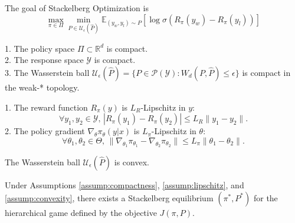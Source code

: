 The goal of Stackelberg Optimization is 
\begin{equation}
    \max_{\pi \in \Pi} \min_{P \in \mathcal{U}_\epsilon(\hat{P})} \mathbb{E}_{(y_w,y_l) \sim P} \left[\log \sigma(R_\pi(y_w) - R_\pi(y_l))\right]
\end{equation}

\begin{assumption}[Compactness]
\label{assump:compactness}
1. The policy space \( \Pi \subset \mathbb{R}^d \) is compact. \\
2. The response space \( \mathcal{Y} \) is compact. \\
3. The Wasserstein ball \( \mathcal{U}_\epsilon(\hat{P}) = \{ P \in \mathcal{P}(\mathcal{Y}) : W_d(P, \hat{P}) \leq \epsilon \} \) is compact in the weak-* topology.
\end{assumption}

\begin{assumption}
\label{assump:lipschitz}
1. The reward function \( R_\pi(y) \) is \( L_R \)-Lipschitz in \( y \): 
\[
\forall y_1, y_2 \in \mathcal{Y}, \, |R_\pi(y_1) - R_\pi(y_2)| \leq L_R \| y_1 - y_2 \|.
\]
2. The policy gradient \( \nabla_\theta \pi_\theta(y|x) \) is \( L_\pi \)-Lipschitz in \( \theta \):
\[
\forall \theta_1, \theta_2 \in \Theta, \, \| \nabla_{\theta_1} \pi_{\theta_1} - \nabla_{\theta_2} \pi_{\theta_2} \| \leq L_\pi \| \theta_1 - \theta_2 \|.
\]
\end{assumption}

\begin{assumption}[Convexity]
\label{assump:convexity}
The Wasserstein ball \( \mathcal{U}_\epsilon(\hat{P}) \) is convex.
\end{assumption}

\begin{proposition}
\label{prop:existence}
Under Assumptions \ref{assump:compactness}, \ref{assump:lipschitz}, and \ref{assump:convexity}, there exists a Stackelberg equilibrium \( (\pi^*, P^*) \) for the hierarchical game defined by the objective \( J(\pi, P) \).
\end{proposition}

